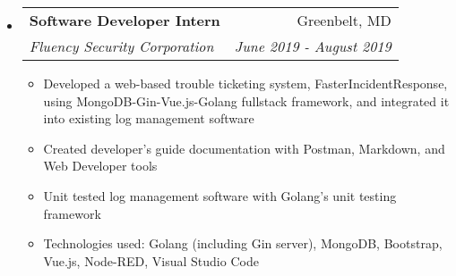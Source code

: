 \documentclass[letterpaper,10pt]{article}
\makeatletter
\newcommand{\resitem}[1]{\item #1 \vspace{-2pt}}
\newcommand{\ressubheading}[4]{
\begin{tabular*}{7.0in}{l@{\extracolsep{\fill}}r}
		\textbf{#1} & #2 \\
		\textit{#3} & \textit{#4} \\
\end{tabular*}\vspace{-6pt}}
\makeatother
\begin{document}
\begin{itemize}
\item
    \ressubheading{Software Developer Intern}{Greenbelt, MD}{Fluency Security Corporation}{June 2019 - August 2019}
	\begin{itemize}
	    \resitem{Developed a web-based trouble ticketing system, FasterIncidentResponse, using MongoDB-Gin-Vue.js-Golang fullstack framework, and integrated it into existing log management software}
		\resitem{Created developer's guide documentation with Postman, Markdown, and Web Developer tools}
		\resitem{Unit tested log management software with Golang's unit testing framework}
		\resitem{Technologies used: Golang (including Gin server), MongoDB, Bootstrap, Vue.js, Node-RED, Visual Studio Code}
	\end{itemize}

\end{itemize}
\end{document}
